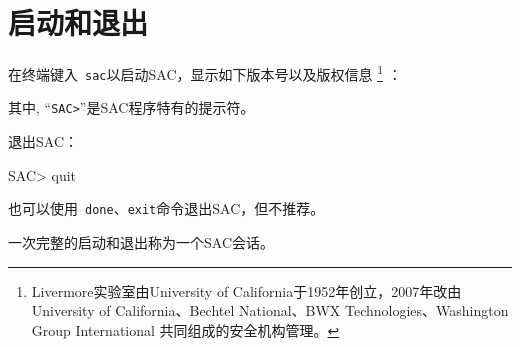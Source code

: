 \section{启动和退出}
在终端键入~\verb+sac+以启动SAC，显示如下版本号以及版权信息
\footnote{Livermore实验室由University of California于1952年创立，2007年改由
University of California、Bechtel National、BWX Technologies、Washington Group International
共同组成的安全机构管理。}
：
其中, ``\verb+SAC>+''是SAC程序特有的提示符。

退出SAC：
\begin{SACCode}
SAC> quit
\end{SACCode}
也可以使用~\verb+done+、\verb+exit+命令退出SAC，但不推荐。

一次完整的启动和退出称为一个SAC会话。
